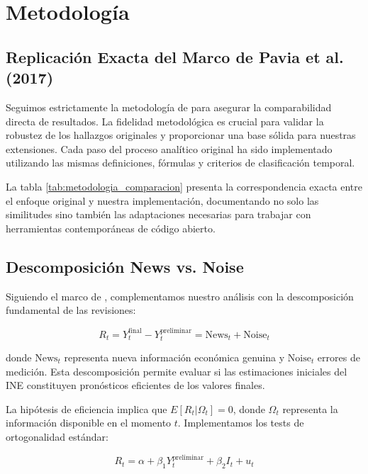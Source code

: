 \documentclass{article}
\begin{document}
\section{Metodología}

\subsection{Replicación Exacta del Marco de Pavia et al. (2017)}

Seguimos estrictamente la metodología de \citet{pavia2017} para asegurar la comparabilidad directa de resultados. La fidelidad metodológica es crucial para validar la robustez de los hallazgos originales y proporcionar una base sólida para nuestras extensiones. Cada paso del proceso analítico original ha sido implementado utilizando las mismas definiciones, fórmulas y criterios de clasificación temporal.

La tabla \ref{tab:metodologia_comparacion} presenta la correspondencia exacta entre el enfoque original y nuestra implementación, documentando no solo las similitudes sino también las adaptaciones necesarias para trabajar con herramientas contemporáneas de código abierto.




\subsection{Descomposición News vs. Noise}

Siguiendo el marco de \citet{mankiw1986}, complementamos nuestro análisis con la descomposición fundamental de las revisiones:

\begin{equation}
R_t = Y_t^{\text{final}} - Y_t^{\text{preliminar}} = \text{News}_t + \text{Noise}_t
\end{equation}

donde $\text{News}_t$ representa nueva información económica genuina y $\text{Noise}_t$ errores de medición. Esta descomposición permite evaluar si las estimaciones iniciales del INE constituyen pronósticos eficientes de los valores finales.

La hipótesis de eficiencia implica que $E[R_t | \Omega_t] = 0$, donde $\Omega_t$ representa la información disponible en el momento $t$. Implementamos los tests de ortogonalidad estándar:

\begin{equation}
R_t = \alpha + \beta_1 Y_t^{\text{preliminar}} + \beta_2 I_t + u_t
\end{equation}
\end{document}
